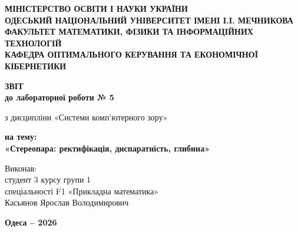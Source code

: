 \begin{titlepage}
    \thispagestyle{empty}
    \setlength{\parindent}{0pt}
    
    \begin{center}
        {\fontsize{12pt}{16pt}\selectfont\bfseries
        МІНІСТЕРСТВО ОСВІТИ І НАУКИ УКРАЇНИ\\[3pt]
        ОДЕСЬКИЙ НАЦІОНАЛЬНИЙ УНІВЕРСИТЕТ ІМЕНІ І.І. МЕЧНИКОВА\\[3pt]
        ФАКУЛЬТЕТ МАТЕМАТИКИ, ФІЗИКИ ТА ІНФОРМАЦІЙНИХ ТЕХНОЛОГІЙ\\[3pt]
        КАФЕДРА ОПТИМАЛЬНОГО КЕРУВАННЯ ТА ЕКОНОМІЧНОЇ КІБЕРНЕТИКИ\par}
    \end{center}

    \vspace{1.5cm}

    \begin{center}
        {\fontsize{18pt}{22pt}\selectfont\bfseries ЗВІТ\\
        до лабораторної роботи № 5\par}
        \vspace{0.4cm}
        {\fontsize{14pt}{18pt}\selectfont
        з дисципліни «Системи комп’ютерного зору»\par}
        \vspace{0.4cm}
        {\fontsize{16pt}{20pt}\selectfont\bfseries
        на тему:\\[6pt]
        «Стереопара: ректифікація, диспаратність, глибина»\par}
    \end{center}

    \vspace{1.5cm}

    \hfill
    \begin{minipage}{0.60\textwidth}
        \raggedright
        {\fontsize{14pt}{19pt}\selectfont
        Виконав:\\[2pt]
        студент 3 курсу групи 1\\[2pt]
        спеціальності F1 «Прикладна математика»\\[2pt]
        Касьянов Ярослав Володимирович
        }
    \end{minipage}

    \vfill

    \begin{center}
        {\fontsize{12pt}{14pt}\selectfont\bfseries Одеса -- 2026\par}
    \end{center}
\end{titlepage}

\setcounter{page}{2}
